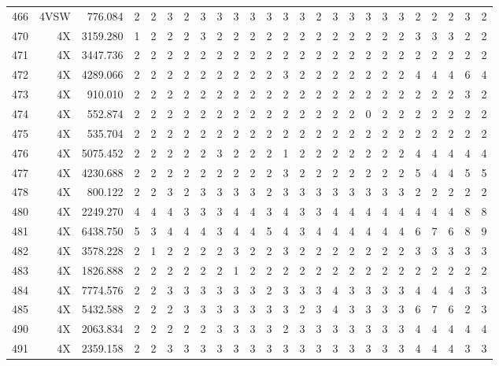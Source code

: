 \documentclass[12pt]{article}\usepackage[]{graphicx}\usepackage[]{color}
\begin{document}
\begin{landscape}
\begin{longtable}[t]{crrrrrrrrrrrrrrrcrrrrrrrr}
466 & 4VSW & 776.084 & 2 & 2 & 3 & 2 & 3 & 3 & 3 & 3 & 3 & 3 & 3 & 2 & 3 & 3 & 3 & 3 & 3 & 2 & 2 & 2 & 3 & 2\\
470 & 4X & 3159.280 & 1 & 2 & 2 & 2 & 3 & 2 & 2 & 2 & 2 & 2 & 2 & 2 & 2 & 2 & 2 & 2 & 2 & 3 & 3 & 3 & 2 & 2\\
471 & 4X & 3447.736 & 2 & 2 & 2 & 2 & 2 & 2 & 2 & 2 & 2 & 2 & 2 & 2 & 2 & 2 & 2 & 2 & 2 & 2 & 2 & 2 & 2 & 2\\
472 & 4X & 4289.066 & 2 & 2 & 2 & 2 & 2 & 2 & 2 & 2 & 2 & 3 & 2 & 2 & 2 & 2 & 2 & 2 & 2 & 4 & 4 & 4 & 6 & 4\\
473 & 4X & 910.010 & 2 & 2 & 2 & 2 & 2 & 2 & 2 & 2 & 2 & 2 & 2 & 2 & 2 & 2 & 2 & 2 & 2 & 2 & 2 & 2 & 3 & 2\\
474 & 4X & 552.874 & 2 & 2 & 2 & 2 & 2 & 2 & 2 & 2 & 2 & 2 & 2 & 2 & 2 & 2 & 0 & 2 & 2 & 2 & 2 & 2 & 2 & 2\\
475 & 4X & 535.704 & 2 & 2 & 2 & 2 & 2 & 2 & 2 & 2 & 2 & 2 & 2 & 2 & 2 & 2 & 2 & 2 & 2 & 2 & 2 & 2 & 2 & 2\\
476 & 4X & 5075.452 & 2 & 2 & 2 & 2 & 2 & 3 & 2 & 2 & 2 & 1 & 2 & 2 & 2 & 2 & 2 & 2 & 2 & 4 & 4 & 4 & 4 & 4\\
477 & 4X & 4230.688 & 2 & 2 & 2 & 2 & 2 & 2 & 2 & 2 & 2 & 3 & 2 & 2 & 2 & 2 & 2 & 2 & 2 & 5 & 4 & 4 & 5 & 5\\
478 & 4X & 800.122 & 2 & 2 & 3 & 2 & 3 & 3 & 3 & 3 & 2 & 3 & 3 & 3 & 3 & 3 & 3 & 3 & 3 & 2 & 2 & 2 & 2 & 2\\
480 & 4X & 2249.270 & 4 & 4 & 4 & 3 & 3 & 3 & 4 & 4 & 3 & 4 & 3 & 3 & 4 & 4 & 4 & 4 & 4 & 4 & 4 & 4 & 8 & 8\\
481 & 4X & 6438.750 & 5 & 3 & 4 & 4 & 4 & 3 & 4 & 4 & 5 & 4 & 3 & 4 & 4 & 4 & 4 & 4 & 4 & 6 & 7 & 6 & 8 & 9\\
482 & 4X & 3578.228 & 2 & 1 & 2 & 2 & 2 & 2 & 3 & 2 & 2 & 3 & 2 & 2 & 2 & 2 & 2 & 2 & 2 & 3 & 3 & 3 & 3 & 3\\
483 & 4X & 1826.888 & 2 & 2 & 2 & 2 & 2 & 2 & 1 & 2 & 2 & 2 & 2 & 2 & 2 & 2 & 2 & 2 & 2 & 2 & 2 & 2 & 2 & 2\\
484 & 4X & 7774.576 & 2 & 2 & 3 & 3 & 3 & 3 & 3 & 3 & 2 & 3 & 3 & 3 & 4 & 3 & 3 & 3 & 3 & 4 & 4 & 4 & 3 & 3\\
485 & 4X & 5432.588 & 2 & 2 & 2 & 3 & 3 & 3 & 3 & 3 & 3 & 3 & 2 & 3 & 4 & 3 & 3 & 3 & 3 & 6 & 7 & 6 & 2 & 3\\
490 & 4X & 2063.834 & 2 & 2 & 2 & 2 & 2 & 3 & 3 & 3 & 3 & 2 & 3 & 3 & 3 & 3 & 3 & 3 & 3 & 4 & 4 & 4 & 4 & 4\\
491 & 4X & 2359.158 & 2 & 2 & 3 & 3 & 3 & 3 & 3 & 3 & 3 & 3 & 3 & 3 & 3 & 3 & 3 & 3 & 3 & 4 & 4 & 4 & 3 & 3\\

\end{longtable}
\end{landscape}
\end{document}
